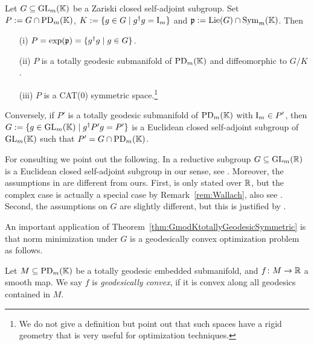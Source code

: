 \begin{theorem} \label{thm:GmodKtotallyGeodesicSymmetric}
	Let $G \subseteq \operatorname{GL}_m(\mathbb K)$ be a Zariski closed self-adjoint subgroup. Set $P := G \cap \operatorname{PD}_m(\mathbb K)$, $K := \{g \in G \mid g^{\dagger} g = \operatorname{I}_m\}$ and $\mathfrak{p} := \operatorname{Lie}(G) \cap \operatorname{Sym}_m(\mathbb K)$. Then
	\begin{itemize}\itemsep 1pt
		\item[(i)] $P = \exp(\mathfrak{p}) = \{ g^{\dagger} g \mid g \in G\}$.
		
		\item[(ii)] $P$ is a totally geodesic submanifold of $\operatorname{PD}_m(\mathbb K)$ and diffeomorphic to $G/K$.
		
		\item[(iii)] $P$ is a CAT(0) symmetric space.\footnote{We do not give a definition but point out that such spaces have a rigid geometry that is very useful for optimization techniques.}
	\end{itemize}
	Conversely, if $P'$ is a totally geodesic submanifold of $\operatorname{PD}_m(\mathbb K)$ with $\operatorname{I}_m \in P'$, then $G := \{g \in \operatorname{GL}_m(\mathbb K) \mid g^{\dagger} P' g = P'\}$ is a Euclidean closed self-adjoint subgroup of $\operatorname{GL}_m(\mathbb K)$ such that $P' = G \cap \operatorname{PD}_m(\mathbb K)$.
\end{theorem}

\begin{remark}
	For consulting \cite{BridsonHaefligerBook} we point out the following.
	In \cite{BridsonHaefligerBook} a reductive subgroup $G \subseteq \operatorname{GL}_m(\mathbb R)$ is a Euclidean closed self-adjoint subgroup in our sense, see \cite[Definition~10.56]{BridsonHaefligerBook}.
	Moreover, the assumptions in \cite[Theorem~II.10.58]{BridsonHaefligerBook} are different from ours. First, \cite[Theorem~II.10.58]{BridsonHaefligerBook} is only stated over $\mathbb R$, but the complex case is actually a special case by Remark~\ref{rem:Wallach}, also see \cite[Example~II.10.57~(2)]{BridsonHaefligerBook}. Second, the assumptions on $G$ are slightly different, but this is justified by \cite[Lemma~II.10.59]{BridsonHaefligerBook}.
	\hfill\remSymbol
\end{remark}

An important application of Theorem~\ref{thm:GmodKtotallyGeodesicSymmetric} is that norm minimization under $G$ is a geodesically convex optimization problem as follows.

\begin{defn}\label{defn:GeodesicConvex}
	Let $M \subseteq \operatorname{PD}_m(\mathbb K)$ be a totally geodesic embedded submanifold, and $f \colon M \to \mathbb R$ a smooth map. We say $f$ is \emph{geodesically convex}, if it is convex along all geodesics contained in $M$.
	\hfill{}
\end{defn}



